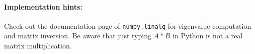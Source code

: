 \documentclass{../uebungsblatt}
\begin{document}
\begin{enumerate}
\begin{adjustwidth}{2.5em}{0pt}
      \paragraph{Implementation hints:}	
      Check out the documentation page of \lstinline!numpy.linalg! for eigenvalue computation and matrix inversion. Be aware that just typing $A*B$ in Python is not a real matrix multiplication.
\end{adjustwidth}
\end{enumerate}
\end{document}
